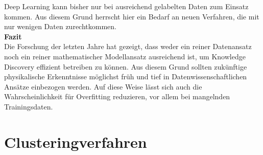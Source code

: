 \documentclass[11pt,ceqn]{book}
\begin{document}
\bigskip
Deep Learning kann bisher nur bei ausreichend gelabelten Daten zum Einsatz kommen. Aus diesem Grund herrscht hier ein Bedarf an neuen Verfahren, die mit nur wenigen Daten zurechtkommen.\\
\bigskip
\textbf{Fazit}\\
Die Forschung der letzten Jahre hat gezeigt, dass weder ein reiner Datenansatz noch ein reiner mathematischer Modellansatz ausreichend ist, um Knowledge Discovery effizient betreiben zu können. Aus diesem Grund sollten zukünftige physikalische Erkenntnisse möglichst früh und tief in Datenwissenschaftlichen Ansätze einbezogen werden. Auf diese Weise lässt sich auch die Wahrscheinlichkeit für Overfitting reduzieren, vor allem bei mangelnden Trainingsdaten.


\chapter{Clusteringverfahren}
~
\end{document}
